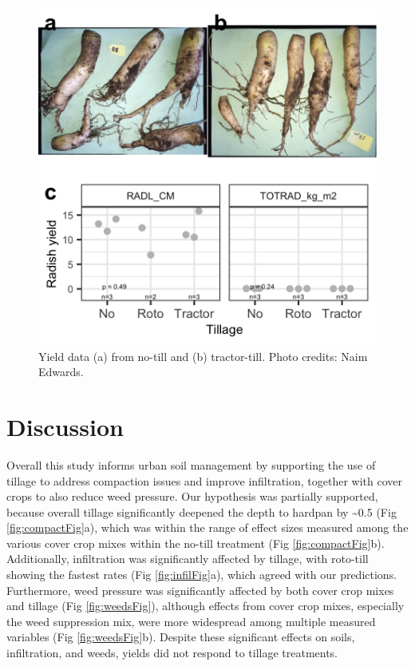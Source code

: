 \documentclass[
  12pt,
]{article}
\begin{document}
\begin{figure}
\includegraphics[width=12.5in]{../figs/yieldPlot} \caption{Yield data (a) from no-till and (b) tractor-till. Photo credits: Naim Edwards.}\label{fig:yieldFig}
\end{figure}

\hypertarget{discussion}{%
\section{Discussion}\label{discussion}}

Overall this study informs urban soil management by supporting the use of tillage to address compaction issues and improve infiltration, together with cover crops to also reduce weed pressure.
Our hypothesis was partially supported, because overall tillage significantly deepened the depth to hardpan by \textasciitilde0.5 (Fig \ref{fig:compactFig}a), which was within the range of effect sizes measured among the various cover crop mixes within the no-till treatment (Fig \ref{fig:compactFig}b).
Additionally, infiltration was significantly affected by tillage, with roto-till showing the fastest rates (Fig \ref{fig:infilFig}a), which agreed with our predictions.
Furthermore, weed pressure was significantly affected by both cover crop mixes and tillage (Fig \ref{fig:weedsFig}), although effects from cover crop mixes, especially the weed suppression mix, were more widespread among multiple measured variables (Fig \ref{fig:weedsFig}b).
Despite these significant effects on soils, infiltration, and weeds, yields did not respond to tillage treatments.
\end{document}
